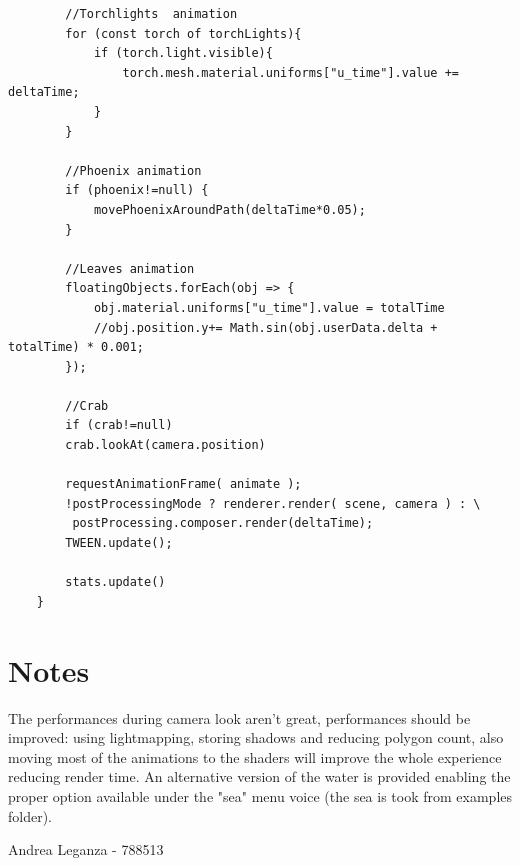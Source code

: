 \documentclass[10pt,a4paper]{article}
\begin{document}
\begin{verbatim}
        //Torchlights  animation
        for (const torch of torchLights){
            if (torch.light.visible){
                torch.mesh.material.uniforms["u_time"].value += deltaTime;
            }
        }
       
        //Phoenix animation
        if (phoenix!=null) {
            movePhoenixAroundPath(deltaTime*0.05);
        }

        //Leaves animation
        floatingObjects.forEach(obj => {
            obj.material.uniforms["u_time"].value = totalTime
            //obj.position.y+= Math.sin(obj.userData.delta + totalTime) * 0.001;
        });

        //Crab
        if (crab!=null)
        crab.lookAt(camera.position)

        requestAnimationFrame( animate );
        !postProcessingMode ? renderer.render( scene, camera ) : \
         postProcessing.composer.render(deltaTime);
        TWEEN.update();

        stats.update()
    }
\end{verbatim}

\section{Notes}

The performances during camera look aren't great, performances should be improved: using lightmapping, storing shadows and reducing polygon count, also moving most of  the animations to  the shaders will improve the  whole experience reducing render time. An alternative version of the water is provided enabling the proper option available under the "sea" menu voice (the sea is took from examples folder).

\bigbreak
\bigbreak
Andrea Leganza - 788513
\end{document}
